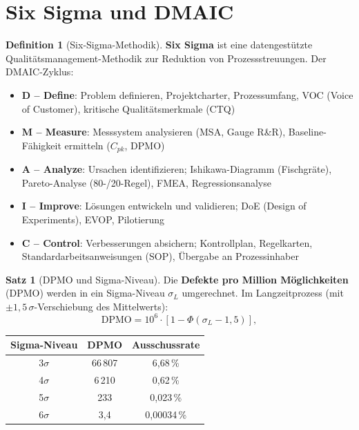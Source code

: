 ﻿\documentclass[a4paper,12pt]{report}
\theoremstyle{definition}
\newtheorem{definition}{Definition}
\newtheorem{satz}{Satz}
\begin{document}
\section{Six Sigma und DMAIC}

\begin{definition}[Six-Sigma-Methodik]
\textbf{Six Sigma} ist eine datengestützte Qualitätsmanagement-Methodik
zur Reduktion von Prozessstreuungen. Der DMAIC-Zyklus:
\begin{itemize}
    \item[-] \textbf{D -- Define}: Problem definieren, Projektcharter, Prozessumfang,
          VOC (Voice of Customer), kritische Qualitätsmerkmale (CTQ)
    \item[-] \textbf{M -- Measure}: Messsystem analysieren (MSA, Gauge R\&R),
          Baseline-Fähigkeit ermitteln ($C_{pk}$, DPMO)
    \item[-] \textbf{A -- Analyze}: Ursachen identifizieren; Ishikawa-Diagramm
          (Fischgräte), Pareto-Analyse (80-/20-Regel), FMEA, Regressionsanalyse
    \item[-] \textbf{I -- Improve}: Lösungen entwickeln und validieren; DoE
          (Design of Experiments), EVOP, Pilotierung
    \item[-] \textbf{C -- Control}: Verbesserungen absichern; Kontrollplan,
          Regelkarten, Standardarbeitsanweisungen (SOP), Übergabe an Prozessinhaber
\end{itemize}
\end{definition}

\begin{satz}[DPMO und Sigma-Niveau]
Die \textbf{Defekte pro Million Möglichkeiten} (DPMO) werden in ein
Sigma-Niveau $\sigma_L$ umgerechnet. Im Langzeitprozess
(mit $\pm 1{,}5\,\sigma$-Verschiebung des Mittelwerts):
\[
  \mathrm{DPMO} = 10^6 \cdot \left[1 - \Phi\left(\sigma_L - 1{,}5\right)\right],
\]
\begin{center}
\begin{tabular}{ccc}
\toprule
Sigma-Niveau & DPMO & Ausschussrate \\
\midrule
3$\sigma$ & 66\,807 & 6{,}68\,\% \\
4$\sigma$ & 6\,210 & 0{,}62\,\% \\
5$\sigma$ & 233 & 0{,}023\,\% \\
6$\sigma$ & 3{,}4 & 0{,}00034\,\% \\
\bottomrule
\end{tabular}
\end{center}
\end{satz}
\end{document}
